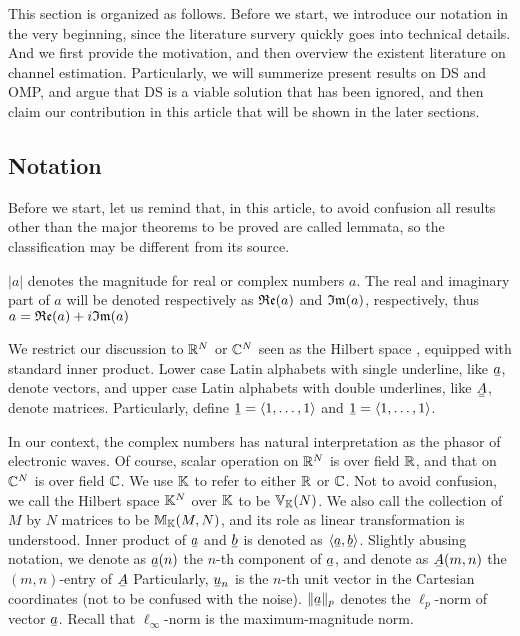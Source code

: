 
This section is organized as follows.
Before we start, we introduce our notation in the very beginning, since the literature survery quickly goes into technical details.
And we first provide the motivation, and then overview the existent literature on channel estimation.
Particularly, we will summerize present results on DS and OMP, and argue that DS is a viable solution that has been ignored, and then claim our contribution in this article that will be shown in the later sections.

\subsection{Notation}

Before we start, let us remind that, in this article, to avoid confusion all results other than the major theorems to be proved are called lemmata, so the classification may be different from its source.

\(|a|\) denotes the magnitude for real or complex numbers \(a\).
The real and imaginary part of \(a\) will be denoted respectively as \(\mathfrak{Re}(a)\) and \(\mathfrak{Im}(a)\), respectively, thus \(a =\mathfrak{Re}(a) +i \mathfrak{Im}(a)\)

We restrict our discussion to \(\mathbb{R}^N\) or \(\mathbb{C}^N\) seen as the Hilbert space , equipped with standard inner product.
Lower case Latin alphabets with single underline, like \(\V{a}\), denote vectors, and upper case Latin alphabets with double underlines, like \(\M{A}\), denote matrices.
Particularly, define \(\V{1} =\IP{ 1, \dotsc, 1 }\) and \(\V{1} =\IP{ 1, \dotsc, 1 }\).

In our context, the complex numbers has natural interpretation as the phasor of electronic waves.
Of course, scalar operation on \(\mathbb{R}^N\) is over field \(\mathbb{R}\), and that on \(\mathbb{C}^N\) is over field \(\mathbb{C}\).
We use \(\mathbb{K}\) to refer to either \(\mathbb{R}\) or \(\mathbb{C}\).
Not to avoid confusion, we call the Hilbert space \(\mathbb{K}^N\) over \(\mathbb{K}\) to be \(\mathbb{V}_{\mathbb{K}} (N)\).
We also call the collection of \(M\) by \(N\) matrices to be \(\mathbb{M}_{\mathbb{K}}(M,N)\), and its role as linear transformation is understood.
Inner product of \(\V{a}\) and \(\V{b}\) is denoted as \(\IP{ \V{a}, \V{b} }\).
Slightly abusing notation, we denote as \(\V{a}(n)\) the \(n\)-th component of \(\V{a}\), and denote as \(\V{A}(m,n)\) the \((m,n)\)-entry of \(\V{A}\)
Particularly, \(\V{u}_n\) is the \(n\)-th unit vector in the Cartesian coordinates (not to be confused with the noise).
\(\|\V{a}\|_p\) denotes the \(\ell_p\)-norm of vector \(\V{a}\).
Recall that \(\ell_\infty\)-norm is the maximum-magnitude norm.

